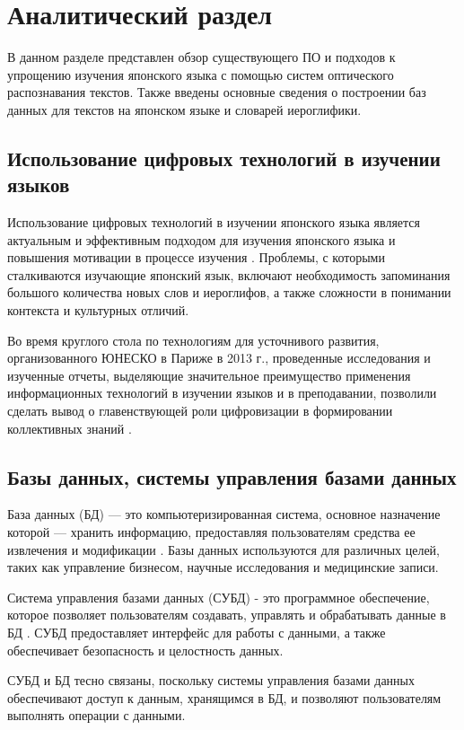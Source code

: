 \chapter{Аналитический раздел}

В данном разделе представлен обзор существующего ПО
и подходов к упрощению изучения японского языка с
помощью систем оптического распознавания текстов. Также
введены основные сведения о построении баз данных
для текстов на японском языке и словарей иероглифики.

\section{Использование цифровых технологий в изучении языков}

Использование цифровых технологий в изучении японского языка 
является актуальным и эффективным подходом для изучения
японского языка и повышения мотивации в процессе
изучения \cite{digital-era}. Проблемы, с которыми сталкиваются
изучающие японский язык, включают необходимость запоминания большого количества новых
слов и иероглифов, а также сложности в понимании контекста
и культурных отличий.

Во время круглого стола по технологиям для усточнивого развития, организованного ЮНЕСКО в Париже в 2013 г.,
проведенные исследования и изученные отчеты, выделяющие значительное
преимущество применения информационных технологий в изучении языков
и в преподавании, позволили сделать вывод о главенствующей роли
цифровизации в формировании коллективных знаний \cite{japanese-comp}.

\section{Базы данных, системы управления базами данных}

База данных (БД) --- это компьютеризированная система, основное назначение
которой --- хранить информацию, предоставляя пользователям
средства ее извлечения и модификации \cite[46]{date}. Базы данных
используются для различных целей, таких как управление бизнесом,
научные исследования и медицинские записи.

Система управления базами данных (СУБД) - это программное
обеспечение, которое позволяет пользователям создавать,
управлять и обрабатывать данные в БД \cite[10--12]{pearson-subd}.
СУБД предоставляет интерфейс для работы с данными, а также обеспечивает
безопасность и целостность данных.

СУБД и БД тесно связаны, поскольку системы управления базами
данных обеспечивают доступ к данным, хранящимся в БД, и позволяют
пользователям выполнять операции с данными.

